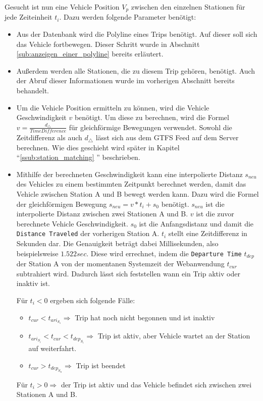   Gesucht ist nun eine Vehicle Position $V_p$ zwischen den einzelnen Stationen für jede Zeiteinheit $t_i$. Dazu werden folgende Parameter benötigt:

  \begin{itemize}
    \item Aus der Datenbank wird die Polyline eines Trips benötigt. Auf dieser soll sich das Vehicle fortbewegen. Dieser Schritt wurde in Abschnitt \ref{sub:anzeigen_einer_polyline} bereits erläutert.

    \item Außerdem werden alle Stationen, die zu diesem Trip gehören, benötigt. Auch der Abruf dieser Informationen wurde im vorherigen Abschnitt bereits behandelt.

    \item Um die Vehicle Position ermitteln zu können, wird die Vehicle Geschwindigkeit $v$ benötigt. Um diese zu berechnen, wird die Formel $v = \frac{d_\triangle}{TimeDifference}$ für gleichförmige Bewegungen verwendet. Sowohl die Zeitdifferenz als auch $d_\triangle$ lässt sich aus dem GTFS Feed auf dem Server berechnen. Wie dies geschieht wird später in Kapitel "`\ref{ssub:station_matching} "' beschrieben.

    \item Mithilfe der berechneten Geschwindigkeit kann eine interpolierte Distanz $s_{neu}$ des Vehicles zu einem bestimmten Zeitpunkt berechnet werden, damit das Vehicle zwischen Station A und B bewegt werden kann. Dazu wird die Formel der gleichförmigen Bewegung $s_{neu} = v * t_i + s_0$ benötigt. $s_{neu}$ ist die interpolierte Distanz zwischen zwei Stationen A und B. $v$ ist die zuvor berechnete Vehicle Geschwindigkeit. $s_0$ ist die Anfangsdistanz und damit die \texttt{Distance Traveled} der vorherigen Station A. $t_i$ stellt eine Zeitdifferenz in Sekunden dar. Die Genauigkeit beträgt dabei Millisekunden, also beispielsweise $1.522 sec$. Diese wird errechnet, indem die \texttt{Departure Time} $t_{dep}$ der Station A von der momentanen Systemzeit der Webanwendung $t_{cur}$ subtrahiert wird. Dadurch lässt sich feststellen wann ein Trip aktiv oder inaktiv ist.

    Für $t_i < 0$ ergeben sich folgende Fälle: 
    \begin{itemize}[label={}]
      \item $t_{cur} < t_{ari_{S_1}} \Rightarrow$ Trip hat noch nicht begonnen und ist inaktiv

      \item $t_{ari_{S_{i}}} < t_{cur} < t_{dep_{S_i}} \Rightarrow$ Trip ist aktiv, aber Vehicle wartet an der Station auf weiterfahrt. 

      \item $t_{cur} > t_{dep_{S_n}} \Rightarrow$ Trip ist beendet
    \end{itemize}

    Für $t_i > 0 \Rightarrow$ der Trip ist aktiv und das Vehicle befindet sich zwischen zwei Stationen A und B.

  \end{itemize}
  

